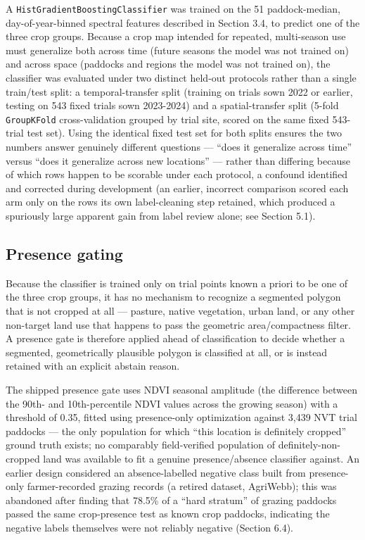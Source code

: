 A \texttt{HistGradientBoostingClassifier} was trained on the 51 paddock-median, day-of-year-binned spectral features described in Section 3.4, to predict one of the three crop groups. Because a crop map intended for repeated, multi-season use must generalize both across time (future seasons the model was not trained on) and across space (paddocks and regions the model was not trained on), the classifier was evaluated under two distinct held-out protocols rather than a single train/test split: a temporal-transfer split (training on trials sown 2022 or earlier, testing on 543 fixed trials sown 2023-2024) and a spatial-transfer split (5-fold \texttt{GroupKFold} cross-validation grouped by trial site, scored on the same fixed 543-trial test set). Using the identical fixed test set for both splits ensures the two numbers answer genuinely different questions --- ``does it generalize across time'' versus ``does it generalize across new locations'' --- rather than differing because of which rows happen to be scorable under each protocol, a confound identified and corrected during development (an earlier, incorrect comparison scored each arm only on the rows its own label-cleaning step retained, which produced a spuriously large apparent gain from label review alone; see Section 5.1).

\subsection{Presence gating}\label{presence-gating}

Because the classifier is trained only on trial points known a priori to be one of the three crop groups, it has no mechanism to recognize a segmented polygon that is not cropped at all --- pasture, native vegetation, urban land, or any other non-target land use that happens to pass the geometric area/compactness filter. A presence gate is therefore applied ahead of classification to decide whether a segmented, geometrically plausible polygon is classified at all, or is instead retained with an explicit abstain reason.

The shipped presence gate uses NDVI seasonal amplitude (the difference between the 90th- and 10th-percentile NDVI values across the growing season) with a threshold of 0.35, fitted using presence-only optimization against 3,439 NVT trial paddocks --- the only population for which ``this location is definitely cropped'' ground truth exists; no comparably field-verified population of definitely-non-cropped land was available to fit a genuine presence/absence classifier against. An earlier design considered an absence-labelled negative class built from presence-only farmer-recorded grazing records (a retired dataset, AgriWebb); this was abandoned after finding that 78.5\% of a ``hard stratum'' of grazing paddocks passed the same crop-presence test as known crop paddocks, indicating the negative labels themselves were not reliably negative (Section 6.4).

